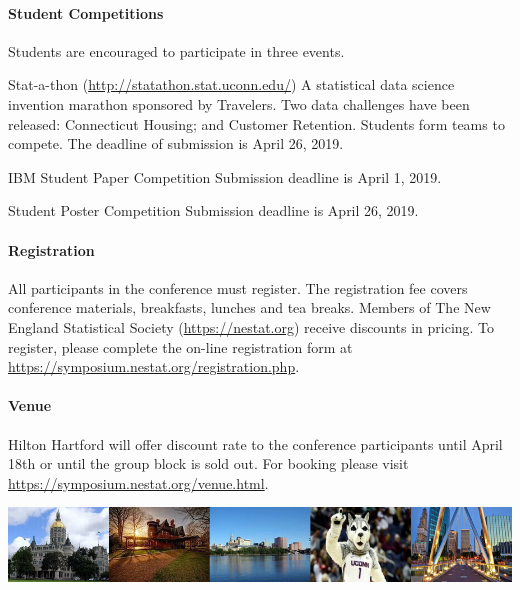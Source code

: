 \documentclass[12pt]{article}
\begin{document}
\paragraph{Student Competitions} Students are encouraged to participate in three events.

\textsf{Stat-a-thon} (\url{http://statathon.stat.uconn.edu/})
A statistical data science invention marathon sponsored by Travelers. Two data challenges have been released: Connecticut Housing; and Customer Retention. Students form teams to compete. The deadline of submission is April 26, 2019.

\textsf{IBM Student Paper Competition} Submission deadline is April 1, 2019.

\textsf{Student Poster Competition} Submission deadline is April 26, 2019.


\paragraph{Registration}
All participants in the conference must register. The registration fee covers conference materials, breakfasts, lunches and tea breaks. Members of The New England Statistical Society (\url{https://nestat.org}) receive discounts in pricing. To register, please complete the on-line registration form at \url{https://symposium.nestat.org/registration.php}.

\paragraph{Venue}
Hilton Hartford will offer discount rate to the conference participants until April 18th or until the group block is sold out. For booking please visit \url{https://symposium.nestat.org/venue.html}.

\vfill

\begin{center}
\includegraphics[width=\textwidth]{hartford-banner}
\end{center}
\end{document}
